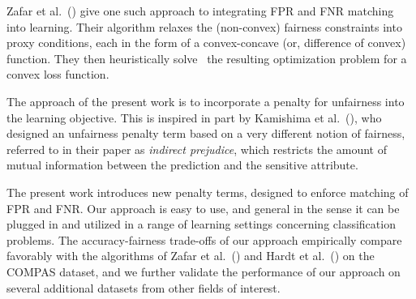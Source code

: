 Zafar et al.~(\citeyear{disparatemistreatment}) give one such approach to integrating FPR and FNR matching into learning. Their algorithm relaxes the (non-convex) fairness constraints into proxy conditions, each in the form of a convex-concave (or, difference of convex) function. They then heuristically solve~\cite{convexconcave} the resulting optimization problem for a convex loss function.

The approach of the present work is to incorporate a penalty for unfairness into the learning objective. This is inspired in part by Kamishima et al.~(\citeyear{kamishima}), who designed an unfairness penalty term based on a very different notion of fairness, referred to in their paper as \textit{indirect prejudice}, which restricts the amount of mutual information between the prediction and the sensitive attribute. %

The present work introduces new penalty terms, designed to enforce matching of FPR and FNR. Our approach is easy to use, and general in the sense it can be plugged in and utilized in a range of learning settings concerning classification problems. The accuracy-fairness trade-offs of our approach empirically compare favorably with the algorithms of Zafar et al.~(\citeyear{disparatemistreatment}) and Hardt et al.~(\citeyear{hardt}) on the COMPAS dataset, and we further validate the performance of our approach on several additional datasets from other fields of interest.